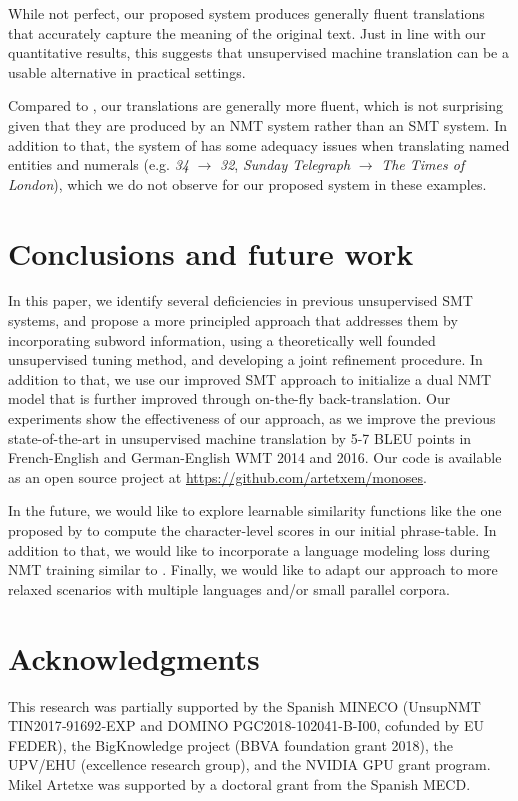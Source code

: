 \documentclass[11pt,a4paper]{article}
\begin{document}
While not perfect, our proposed system produces generally fluent translations that accurately capture the meaning of the original text. Just in line with our quantitative results, this suggests that unsupervised machine translation can be a usable alternative in practical settings.

Compared to \citet{artetxe2018usmt}, our translations are generally more fluent, which is not surprising given that they are produced by an NMT system rather than an SMT system. In addition to that, the system of \citet{artetxe2018usmt} has some adequacy issues when translating named entities and numerals (e.g.  \textit{34} $\rightarrow$ \textit{32}, \textit{Sunday Telegraph} $\rightarrow$ \textit{The Times of London}), which we do not observe for our proposed system in these examples.


\section{Conclusions and future work}
\label{sec:conclusions}

In this paper, we identify several deficiencies in previous unsupervised SMT systems, and propose a more principled approach that addresses them by incorporating subword information, using a theoretically well founded unsupervised tuning method, and developing a joint refinement procedure. In addition to that, we use our improved SMT approach to initialize a dual NMT model that is further improved through on-the-fly back-translation. Our experiments show the effectiveness of our approach, as we improve the previous state-of-the-art in unsupervised machine translation by 5-7 BLEU points in French-English and German-English WMT 2014 and 2016. Our code is available as an open source project at \url{https://github.com/artetxem/monoses}.

In the future, we would like to explore learnable similarity functions like the one proposed by \citep{mccallum2005conditional} to compute the character-level scores in our initial phrase-table. In addition to that, we would like to incorporate a language modeling loss during NMT training similar to \citet{he2016dual}. Finally, we would like to adapt our approach to more relaxed scenarios with multiple languages and/or small parallel corpora.


\section*{Acknowledgments}

This research was partially supported by the Spanish MINECO (UnsupNMT TIN2017‐91692‐EXP and DOMINO PGC2018-102041-B-I00, cofunded by EU FEDER), the BigKnowledge project (BBVA foundation grant 2018), the UPV/EHU (excellence research group), and the NVIDIA GPU grant program. Mikel Artetxe was supported by a doctoral grant from the Spanish MECD.




\end{document}

